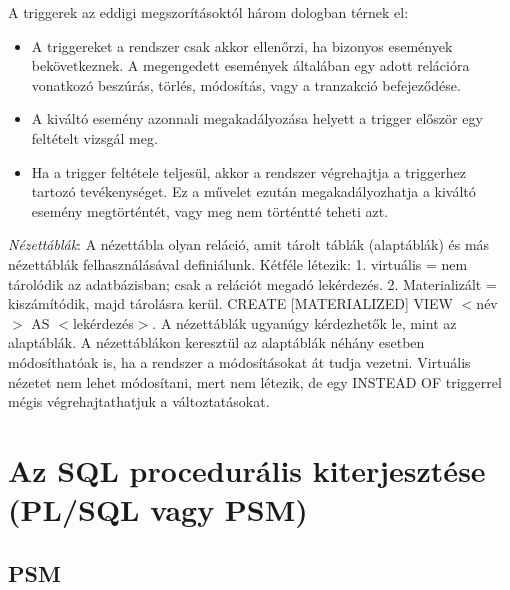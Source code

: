 \documentclass[margin=0px]{article}
\begin{document}
A triggerek az eddigi megszorításoktól három dologban térnek el:
\begin{itemize}
    \item A triggereket a rendszer csak akkor ellenőrzi, ha bizonyos események bekövetkeznek. A megengedett események általában egy adott relációra vonatkozó beszúrás, törlés, módosítás, vagy a tranzakció befejeződése.
    \item A kiváltó esemény azonnali megakadályozása helyett a trigger először egy feltételt vizsgál meg.
    \item Ha a trigger feltétele teljesül, akkor a rendszer végrehajtja a triggerhez tartozó tevékenységet. Ez a művelet ezután megakadályozhatja a kiváltó esemény megtörténtét, vagy meg nem történtté teheti azt.
\end{itemize}
\textit{Nézettáblák}: A nézettábla olyan reláció, amit tárolt táblák (alaptáblák) és más nézettáblák felhasználásával definiálunk. Kétféle létezik: 1. virtuális = nem tárolódik az adatbázisban; csak a relációt megadó lekérdezés. 2. Materializált = kiszámítódik, majd tárolásra
kerül. CREATE [MATERIALIZED] VIEW $<$név$>$ AS $<$lekérdezés$>$. A nézettáblák ugyanúgy kérdezhetők le, mint az alaptáblák. A nézettáblákon keresztül az alaptáblák néhány esetben módosíthatóak is, ha a rendszer a módosításokat át tudja vezetni. Virtuális nézetet nem lehet módosítani, mert nem létezik, de egy INSTEAD OF triggerrel mégis végrehajtathatjuk a változtatásokat.

\section{Az SQL procedurális kiterjesztése (PL/SQL vagy PSM)}

\subsection{PSM}
\end{document}
